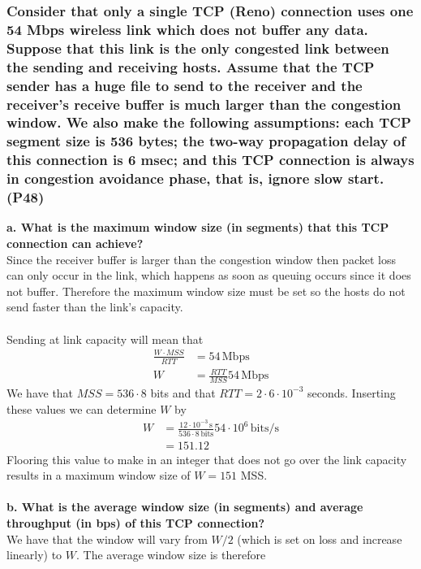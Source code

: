 \subsubsection{Consider that only a single TCP (Reno) connection uses one 54 Mbps wireless link which does not buffer any data. Suppose that this link is the only congested link between the sending and receiving hosts. Assume that the TCP sender has a huge file to send to the receiver and the receiver's receive buffer is much larger than the congestion window. We also make the following assumptions: each TCP segment size is 536 bytes; the two-way propagation delay of this connection is 6 msec; and this TCP connection is always in congestion avoidance phase, that is, ignore slow start. (P48)}

\textbf{a. What is the maximum window size (in segments) that this TCP connection can achieve?} \\
Since the receiver buffer is larger than the congestion window then packet loss can only occur in the link, which happens as soon as queuing occurs since it does not buffer. Therefore the maximum window size must be set so the hosts do not send faster than the link's capacity. \\
\\
Sending at link capacity will mean that 
\begin{equation*}
\begin{split}
    \frac{W \cdot MSS}{RTT} &= 54 \, \text{Mbps} \\
    W &= \frac{RTT}{MSS} 54 \, \text{Mbps}
\end{split}
\end{equation*}
We have that $MSS = 536 \cdot 8$ bits and that $RTT = 2 \cdot 6 \cdot 10^{-3}$ seconds. Inserting these values we can determine $W$ by
\begin{equation*}
\begin{split}
    W &= \frac{12 \cdot 10^{-3} \, \text{s}}{536 \cdot 8 \, \text{bits}} 54 \cdot 10^6 \, \text{bits/s} \\
    &= 151.12
\end{split}
\end{equation*}
Flooring this value to make in an integer that does not go over the link capacity results in a maximum window size of $W = 151$ MSS. \\
\\
\textbf{b. What is the average window size (in segments) and average throughput (in bps) of this TCP connection?} \\
We have that the window will vary from $W/2$ (which is set on loss and increase linearly) to $W$. The average window size is therefore 
